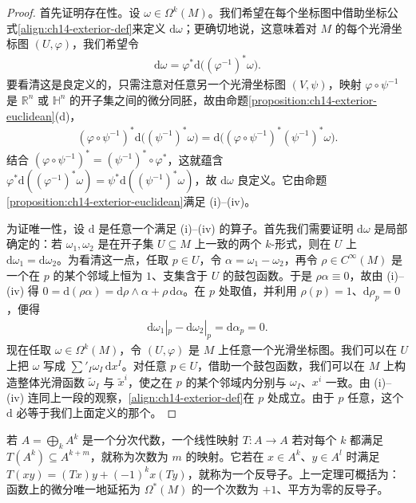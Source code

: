 \documentclass[../../main.tex]{subfiles}
\begin{document}
\begin{proof}
首先证明存在性。设 $\omega\in\Omega^k(M)$。我们希望在每个坐标图中借助坐标公式\eqref{align:ch14-exterior-def}来定义 $\mathrm{d}\omega$；更确切地说，这意味着对 $M$ 的每个光滑坐标图 $(U,\varphi)$，我们希望令
\begin{align}
\mathrm{d}\omega=\varphi^*\mathrm{d}\bigl((\varphi^{-1})^*\omega\bigr).\label{align:ch14-chart-def}
\end{align}
要看清这是良定义的，只需注意对任意另一个光滑坐标图 $(V,\psi)$，映射 $\varphi\circ\psi^{-1}$ 是 $\mathbb{R}^n$ 或 $\mathbb{H}^n$ 的开子集之间的微分同胚，故由命题\ref{proposition:ch14-exterior-euclidean}(d)，
\begin{align*}
(\varphi\circ\psi^{-1})^*\mathrm{d}\bigl((\psi^{-1})^*\omega\bigr)
=\mathrm{d}\bigl((\varphi\circ\psi^{-1})^*(\psi^{-1})^*\omega\bigr).
\end{align*}
结合 $(\varphi\circ\psi^{-1})^*=(\psi^{-1})^*\circ\varphi^*$，这就蕴含 $\varphi^*\mathrm{d}((\varphi^{-1})^*\omega)=\psi^*\mathrm{d}((\psi^{-1})^*\omega)$，故 $\mathrm{d}\omega$ 良定义。它由命题\ref{proposition:ch14-exterior-euclidean}满足 (i)--(iv)。

为证唯一性，设 $\mathrm{d}$ 是任意一个满足 (i)--(iv) 的算子。首先我们需要证明 $\mathrm{d}\omega$ 是局部确定的：若 $\omega_1,\omega_2$ 是在开子集 $U\subseteq M$ 上一致的两个 $k$-形式，则在 $U$ 上 $\mathrm{d}\omega_1=\mathrm{d}\omega_2$。为看清这一点，任取 $p\in U$，令 $\alpha=\omega_1-\omega_2$，再令 $\rho\in C^\infty(M)$ 是一个在 $p$ 的某个邻域上恒为 $1$、支集含于 $U$ 的鼓包函数。于是 $\rho\alpha\equiv0$，故由 (i)--(iv) 得 $0=\mathrm{d}(\rho\alpha)=\mathrm{d}\rho\wedge\alpha+\rho\,\mathrm{d}\alpha$。在 $p$ 处取值，并利用 $\rho(p)=1$、$\mathrm{d}\rho_p=0$，便得
\begin{align*}
\mathrm{d}\omega_1|_p-\mathrm{d}\omega_2|_p=\mathrm{d}\alpha_p=0.
\end{align*}
现在任取 $\omega\in\Omega^k(M)$，令 $(U,\varphi)$ 是 $M$ 上任意一个光滑坐标图。我们可以在 $U$ 上把 $\omega$ 写成 $\sum'_I\omega_I\,\mathrm{d}x^I$。对任意 $p\in U$，借助一个鼓包函数，我们可以在 $M$ 上构造整体光滑函数 $\widetilde\omega_I$ 与 $\widetilde x^i$，使之在 $p$ 的某个邻域内分别与 $\omega_I$、$x^i$ 一致。由 (i)--(iv) 连同上一段的观察，\eqref{align:ch14-exterior-def}在 $p$ 处成立。由于 $p$ 任意，这个 $\mathrm{d}$ 必等于我们上面定义的那个。
\end{proof}

若 $A=\bigoplus_k A^k$ 是一个分次代数，一个线性映射 $T:A\to A$ 若对每个 $k$ 都满足 $T(A^k)\subseteq A^{k+m}$，就称为次数为 $m$ 的映射。它若在 $x\in A^k$、$y\in A^l$ 时满足 $T(xy)=(Tx)y+(-1)^kx(Ty)$，就称为一个反导子。上一定理可概括为：函数上的微分唯一地延拓为 $\Omega^*(M)$ 的一个次数为 $+1$、平方为零的反导子。
\end{document}
